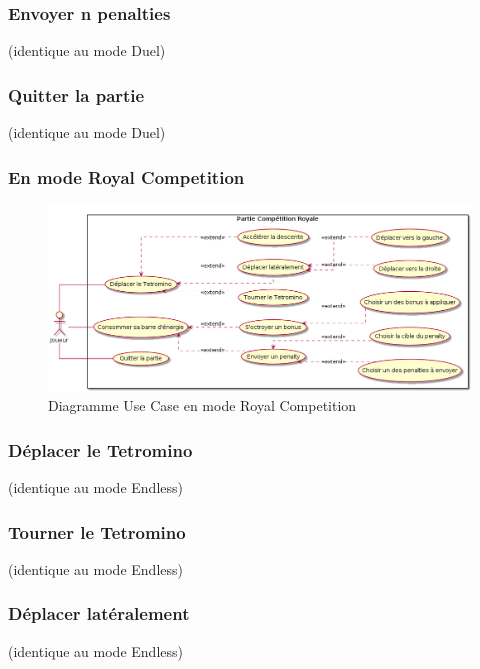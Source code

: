 \documentclass{article}
\begin{document}
\subsubsection*{Envoyer n penalties} (identique au mode Duel)

\subsubsection*{Quitter la partie} (identique au mode Duel)

\subsubsection{En mode Royal Competition}

\begin{figure}[!h]
    \centering
    \includegraphics[width=1\textwidth]{../../res/uml/usecase/RoyalUseCase.png}
    \caption{Diagramme Use Case en mode Royal Competition}
    \label{fig:Royal-Competition}
\end{figure}

\subsubsection*{Déplacer le Tetromino} (identique au mode Endless)
\subsubsection*{Tourner le Tetromino} (identique au mode Endless)
\subsubsection*{Déplacer latéralement} (identique au mode Endless)
\end{document}
